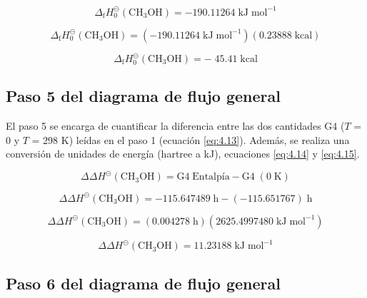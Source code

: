 \begin{equation}
	\Delta_\mathrm{{f}} H^{\circleddash}_{0}\mathrm{(CH_3OH) = -190.11264\; kJ\;mol^{-1}}
\label{eq:4.9}
\end{equation}

\begin{equation}
	\Delta_\mathrm{{f}} H^{\circleddash}_{0}\mathrm{(CH_3OH) = (-190.11264\; kJ\;mol^{-1})(0.23888\; kcal)}
\label{eq:4.10}
\end{equation}

\begin{equation}
	\Delta_\mathrm{{f}} H^{\circleddash}_{0}\mathrm{(CH_3OH) = -\;45.41\;kcal}
\label{eq:4.11}
\end{equation}


\subsection{Paso 5 del diagrama de flujo general}

El paso 5 se encarga de cuantificar la diferencia entre las  dos cantidades G4 ($T$ = 0 y $T$ = 298 K) leídas en el paso 1 (ecuación \ref{eq:4.13}). Además, se realiza una conversión de unidades de energía (hartree a kJ), ecuaciones \ref{eq:4.14} y \ref{eq:4.15}.

\begin{equation}
	\Delta \Delta H^{\circleddash}\mathrm{(CH_3OH) = G4\;\textrm{Entalpía} - G4\;(0\;K)}
\label{eq:4.12}
\end{equation}

\begin{equation}
	\Delta \Delta H^{\circleddash}\mathrm{(CH_3OH) = -115.647489\;\mathrm{h} - (-115.651767)\;h}
\label{eq:4.13}
\end{equation}

\begin{equation}
	\Delta \Delta H^{\circleddash}\mathrm{(CH_3OH) = (0.004278\;\mathrm{h})(2625.4997480\; kJ\;mol^{-1})}
\label{eq:4.14}
\end{equation}

\begin{equation}
	\Delta \Delta H^{\circleddash}\mathrm{(CH_3OH) = 11.23188\;kJ\;mol^{-1}}
\label{eq:4.15}
\end{equation}


\subsection{Paso 6 del diagrama de flujo general}

